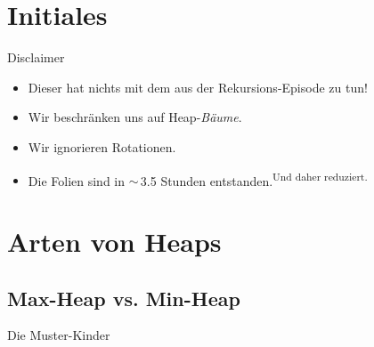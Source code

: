 


\section{Initiales}
\begin{frame}{Disclaimer}
    \begin{itemize}[<+(1)->]
        \itemsep12pt
        \item Dieser  hat nichts mit dem aus der Rekursions-\allowbreak Episode zu tun!
        \item Wir beschränken uns auf Heap-\textit{Bäume}.
        \item Wir ignorieren Rotationen.
        \item Die Folien sind in \(\sim\)\,3.5 Stunden entstanden.\textsuperscript{Und daher reduziert.}
    \end{itemize}
\end{frame}
\SidebarReset

\section{Arten von Heaps}
\subsection{Max-Heap vs. Min-Heap}
\savebox{}
\begin{frame}{Die Muster-Kinder}
\begin{columns}[c]
    \begin{column}{.45\linewidth}
    \end{column} \begin{column}{.45\linewidth}
    \end{column}
\end{columns}
\end{frame}

